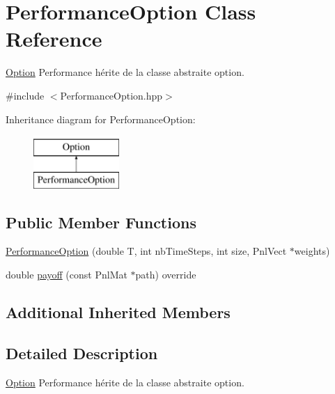 \hypertarget{classPerformanceOption}{\section{Performance\-Option Class Reference}
\label{classPerformanceOption}
}


\hyperlink{classOption}{Option} Performance hérite de la classe abstraite option.  




{\ttfamily \#include $<$Performance\-Option.\-hpp$>$}

Inheritance diagram for Performance\-Option\-:\begin{figure}[H]
\begin{center}
\leavevmode
\includegraphics[height=2.000000cm]{classPerformanceOption}
\end{center}
\end{figure}
\subsection*{Public Member Functions}
\begin{DoxyCompactItemize}
\item 
\hyperlink{classPerformanceOption_a2bee53d8bcc5cf42fbe9c1144985eea1}{Performance\-Option} (double T, int nb\-Time\-Steps, int size, Pnl\-Vect $\ast$weights)
\item 
double \hyperlink{classPerformanceOption_ad1effaaa7b93de07b5add0805c070bc7}{payoff} (const Pnl\-Mat $\ast$path) override
\end{DoxyCompactItemize}
\subsection*{Additional Inherited Members}


\subsection{Detailed Description}
\hyperlink{classOption}{Option} Performance hérite de la classe abstraite option. 

